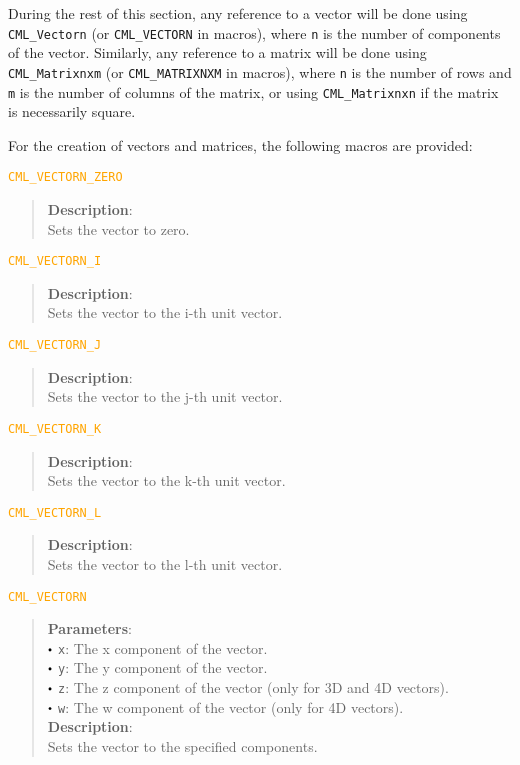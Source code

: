 \documentclass[a4paper,oneside,8pt]{extarticle}
\newcommand{\macro}[1]{
  \noindent\textcolor{orange}{\texttt{#1}}
  \vspace{-0.3em}
}
\renewcommand{\dot}{\raisebox{0.3ex}{\scalebox{0.6}{$\bullet$}}}
\theoremstyle{definition}
\begin{document}
During the rest of this section, any reference to a vector will be done using \texttt{CML\_Vectorn} (or \texttt{CML\_VECTORN} in macros), where \texttt{n} is the number of components of the vector. Similarly, any reference to a matrix will be done using \texttt{CML\_Matrixnxm} (or \texttt{CML\_MATRIXNXM} in macros), where \texttt{n} is the number of rows and \texttt{m} is the number of columns of the matrix, or using \texttt{CML\_Matrixnxn} if the matrix is necessarily square.

For the creation of vectors and matrices, the following macros are provided: \newline

\macro{CML\_VECTORN\_ZERO}
\begin{quote}
  \textbf{Description}: \\
  Sets the vector to zero. \\
\end{quote}

\macro{CML\_VECTORN\_I}
\begin{quote}
  \textbf{Description}: \\
  Sets the vector to the i-th unit vector. \\
\end{quote}

\macro{CML\_VECTORN\_J}
\begin{quote}
  \textbf{Description}: \\
  Sets the vector to the j-th unit vector. \\
\end{quote}

\macro{CML\_VECTORN\_K}
\begin{quote}
  \textbf{Description}: \\
  Sets the vector to the k-th unit vector. \\
\end{quote}

\macro{CML\_VECTORN\_L}
\begin{quote}
  \textbf{Description}: \\
  Sets the vector to the l-th unit vector. \\
\end{quote}

\macro{CML\_VECTORN}
\begin{quote}
  \textbf{Parameters}: \\
  $\dot$ \texttt{x}: The x component of the vector. \\
  $\dot$ \texttt{y}: The y component of the vector. \\
  $\dot$ \texttt{z}: The z component of the vector (only for 3D and 4D vectors). \\
  $\dot$ \texttt{w}: The w component of the vector (only for 4D vectors). \\

  \vspace{-0.75em}
  \textbf{Description}: \\
  Sets the vector to the specified components. \\
\end{quote}
\end{document}
